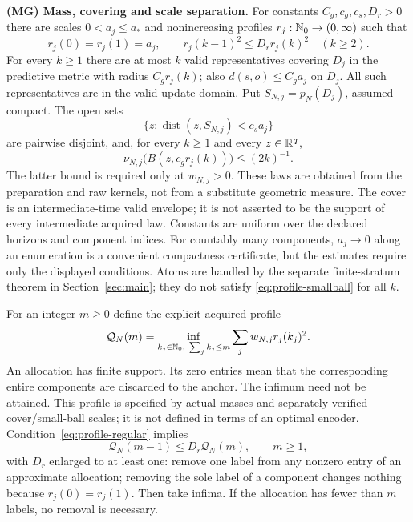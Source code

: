 \smallskip\noindent\textbf{(MG) Mass, covering and scale separation.}
For constants $C_g,c_g,c_s,D_r>0$ there are scales $0<a_j\le a_*$ and nonincreasing profiles $r_j:\mathbb N_0\to(0,\infty)$ such that
\begin{equation}\label{eq:profile-regular}
 r_j(0)=r_j(1)=a_j,\qquad r_j(k-1)^2\le D_r r_j(k)^2\quad(k\ge2).
\end{equation}
For every $k\ge1$ there are at most $k$ valid representatives covering $D_j$ in the predictive metric with radius $C_g r_j(k)$; also $d(s,o)\le C_g a_j$ on $D_j$. All such representatives are in the valid update domain. Put $S_{N,j}=p_N(D_j)$, assumed compact. The open sets
\[
 \{z:\operatorname{dist}(z,S_{N,j})<c_s a_j\}
\]
are pairwise disjoint, and, for every $k\ge1$ and every $z\in\mathbb R^q$,
\begin{equation}\label{eq:profile-smallball}
 \nu_{N,j}\big(B(z,c_g r_j(k))\big)\le(2k)^{-1}.
\end{equation}
The latter bound is required only at $w_{N,j}>0$. These laws are obtained from the preparation and raw kernels, not from a substitute geometric measure. The cover is an intermediate-time valid envelope; it is not asserted to be the support of every intermediate acquired law. Constants are uniform over the declared horizons and component indices. For countably many components, $a_j\to0$ along an enumeration is a convenient compactness certificate, but the estimates require only the displayed conditions. Atoms are handled by the separate finite-stratum theorem in Section~\ref{sec:main}; they do not satisfy \eqref{eq:profile-smallball} for all $k$.

For an integer $m\ge0$ define the explicit acquired profile
\begin{equation}\label{eq:bridge-profile}
 \mathcal Q_N(m)=\inf_{\substack{k_j\in\mathbb N_0,\ \sum_jk_j\le m}}
             \sum_j w_{N,j}r_j(k_j)^2.
\end{equation}
An allocation has finite support. Its zero entries mean that the corresponding entire components are discarded to the anchor. The infimum need not be attained. This profile is specified by actual masses and separately verified cover/small-ball scales; it is not defined in terms of an optimal encoder. Condition~\eqref{eq:profile-regular} implies
\begin{equation}\label{eq:one-label}
 \mathcal Q_N(m-1)\le D_r\mathcal Q_N(m),\qquad m\ge1,
\end{equation}
with $D_r$ enlarged to at least one: remove one label from any nonzero entry of an approximate allocation; removing the sole label of a component changes nothing because $r_j(0)=r_j(1)$. Then take infima. If the allocation has fewer than $m$ labels, no removal is necessary.

